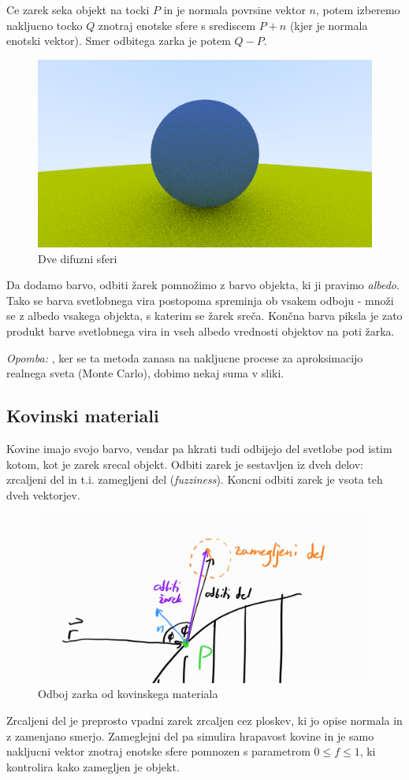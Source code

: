 \documentclass[12pt, a4paper]{article}
\begin{document}
Ce zarek seka objekt na tocki $P$ in je normala povrsine vektor $n$, potem izberemo nakljucno tocko $Q$
znotraj enotske sfere s srediscem $P + n$ (kjer je normala enotski vektor). Smer odbitega zarka je potem
$Q - P$.

\begin{figure}[H]
	\centering
	\includegraphics[width=400pt]{difuzni}
	\caption{Dve difuzni sferi}
\end{figure}

Da dodamo barvo, odbiti žarek pomnožimo z barvo objekta, ki ji pravimo \textit{albedo}. Tako se barva
svetlobnega vira postopoma spreminja ob vsakem odboju - množi se z albedo vsakega objekta, s katerim se
žarek sreča. Končna barva piksla je zato produkt barve svetlobnega vira in vseh albedo vrednosti
objektov na poti žarka.

\textit{Opomba: }, ker se ta metoda zanasa na nakljucne procese za aproksimacijo realnega sveta (Monte Carlo),
dobimo nekaj suma v sliki.

\subsection{Kovinski materiali}

Kovine imajo svojo barvo, vendar pa hkrati tudi odbijejo del svetlobe pod istim kotom, kot je
zarek srecal objekt. Odbiti zarek je sestavljen iz dveh delov: zrcaljeni del in t.i. zamegljeni del
(\textit{fuzziness}). Koncni odbiti zarek je vsota teh dveh vektorjev.

\begin{figure}[H]
	\centering
	\includegraphics[width=400pt]{metal}
	\caption{Odboj zarka od kovinskega materiala}
\end{figure}

Zrcaljeni del je preprosto vpadni zarek zrcaljen cez ploskev, ki jo opise normala in z zamenjano smerjo.
Zameglejni del pa simulira hrapavost kovine in je samo nakljucni vektor znotraj enotske sfere pomnozen
s parametrom $0 \leq f \leq 1$, ki kontrolira kako zamegljen je objekt.

\printbibliography
\end{document}
